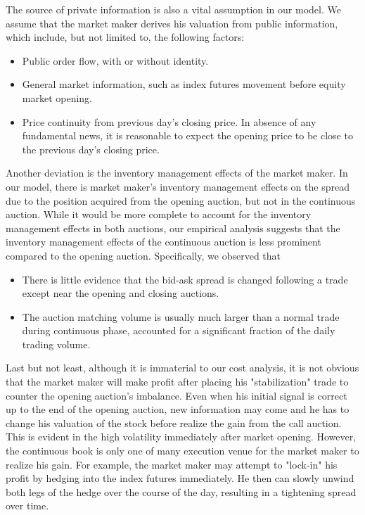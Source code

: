 \documentclass{article}
\begin{document}
The source of private information is also a vital assumption in our model. We assume that the market maker derives his valuation from public information, which include, but not limited to, the following factors:
\begin{itemize}
  \item Public order flow, with or without identity.
  \item General market information, such as index futures movement before equity market opening.
  \item Price continuity from previous day's closing price. In absence of any fundamental news, it is reasonable to expect the opening price to be close to the previous day's closing price.
\end{itemize}

Another deviation is the inventory management effects of the market maker. In our model, there is market maker's inventory management effects on the spread due to the position acquired from the opening auction, but not in the continuous auction. While it would be more complete to account for the inventory management effects in both auctions, our empirical analysis suggests that the inventory management effects of the continuous auction is less prominent compared to the opening auction. Specifically, we observed that
\begin{itemize}
  \item There is little evidence that the bid-ask spread is changed following a trade except near the opening and closing auctions.
  \item The auction matching volume is usually much larger than a normal trade during continuous phase, accounted for a significant fraction of the daily trading volume.
\end{itemize}

Last but not least, although it is immaterial to our cost analysis, it is not obvious that the market maker will make profit after placing his "stabilization" trade to counter the opening auction's imbalance. Even when his initial signal is correct up to the end of the opening auction, new information may come and he has to change his valuation of the stock before realize the gain from the call auction. This is evident in the high volatility immediately after market opening. However, the continuous book is only one of many execution venue for the market maker to realize his gain. For example, the market maker may attempt to "lock-in" his profit by hedging into the index futures immediately. He then can slowly unwind both legs of the hedge over the course of the day, resulting in a tightening spread over time.
\end{document}
